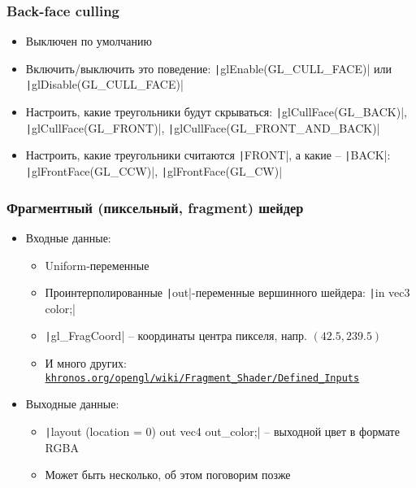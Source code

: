 \documentclass[10pt]{beamer}
\begin{document}
\begin{frame}[fragile]
\frametitle{Back-face culling}
\begin{itemize}
\item Выключен по умолчанию
\pause
\item Включить/выключить это поведение: \texttt|glEnable(GL_CULL_FACE)| или \texttt|glDisable(GL_CULL_FACE)|
\pause
\item Настроить, какие треугольники будут скрываться: \texttt|glCullFace(GL_BACK)|, \texttt|glCullFace(GL_FRONT)|, \texttt|glCullFace(GL_FRONT_AND_BACK)|
\pause
\item Настроить, какие треугольники считаются \texttt|FRONT|, а какие -- \texttt|BACK|: \texttt|glFrontFace(GL_CCW)|, \texttt|glFrontFace(GL_CW)|
\end{itemize}
\end{frame}

\begin{frame}[fragile]
\frametitle{Фрагментный (пиксельный, fragment) шейдер}
\begin{itemize}
\pause
\item Входные данные:
\pause
\begin{itemize}
\item Uniform-переменные
\pause
\item Проинтерполированные \texttt|out|-переменные вершинного шейдера: \texttt|in vec3 color;|
\pause
\item \texttt|gl_FragCoord| -- координаты центра пикселя, напр. \begin{math}(42.5, 239.5)\end{math}
\pause
\item И много других: \href{https://www.khronos.org/opengl/wiki/Fragment_Shader/Defined_Inputs}{\nolinkurl{khronos.org/opengl/wiki/Fragment\_Shader/Defined\_Inputs}}
\end{itemize}
\pause
\item Выходные данные:
\begin{itemize}
\item \texttt|layout (location = 0) out vec4 out_color;| -- выходной цвет в формате RGBA
\pause
\item Может быть несколько, об этом поговорим позже
\end{itemize}
\end{itemize}
\end{frame}
\end{document}
